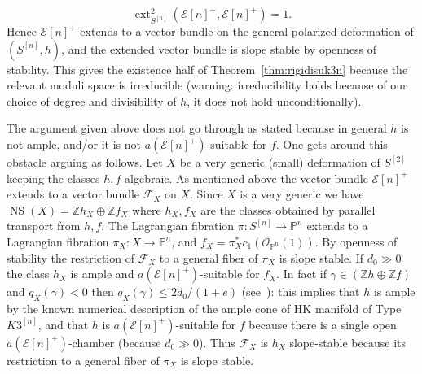 \documentclass[11pt]{amsart}
\newcommand{\PP}{{\mathbb P}}
\newcommand{\ZZ}{{\mathbb Z}}
\let\mathcal\mathscr
\def\cE{\mathcal{E}}
\def\cF{\mathcal{F}}
\def\cO{\mathcal{O}}
\DeclareMathOperator{\ext}{ext}
\DeclareMathOperator{\NS}{NS}
\theoremstyle{definition}
\theoremstyle{remark}
\begin{document}
%
\begin{equation}
%
\ext^2_{S^{[n]}}(\cE[n]^{+},\cE[n]^{+})=1. 
%
\end{equation}
%
Hence  $\cE[n]^{+}$ extends to a vector bundle on the general polarized deformation of 
$(S^{[n]},h)$, and the extended vector bundle is slope stable by openness of stability. This gives the existence half of Theorem~\ref{thm:rigidisuk3n}  because the relevant moduli space is irreducible 
(warning: irreducibility holds because of our choice of degree and divisibility of $h$, it does not hold unconditionally). 

The  argument given  above does not go through as stated because in 
general $h$ is not ample, and/or it is not $a(\cE[n]^{+})$-suitable for $f$. One gets around this obstacle arguing as follows. Let 
$X$ be a very generic (small) deformation of $S^{[2]}$ keeping the classes $h,f$ algebraic. As mentioned above the vector bundle $\cE[n]^{+}$ extends to a vector bundle $\cF_X$ on $X$. Since $X$ is a very generic we have $\NS(X)=\ZZ h_X\oplus\ZZ f_X$ where $h_X, f_X$ are the classes obtained by parallel transport from $h,f$. The Lagrangian fibration $\pi\colon S^{[n]}\to\PP^n$ extends to a Lagrangian fibration 
$\pi_X\colon X\to \PP^n$, and $f_X=\pi_X^{*}c_1(\cO_{\PP^n}(1))$. By openness of stability the 
restriction of $\cF_X$ to a general fiber of $\pi_X$ is slope stable.
If $d_0\gg 0$ the class $h_X$ is ample and $a(\cE[n]^{+})$-suitable for $f_X$. In fact if $\gamma\in(\ZZ h\oplus\ZZ f)$ and $q_X(\gamma)<0$ then 
$q_X(\gamma)\le 2d_0/(1+e)$ (see~\cite[Lmm.~4.3]{og:fascimod}): this implies that $h$ is ample by the known numerical description of the ample cone of HK manifold of Type $K3^{[n]}$, and  that $h$ is  $a(\cE[n]^{+})$-suitable for $f$ because there is a single 
open $a(\cE[n]^{+})$-chamber (because $d_0\gg 0$). Thus $\cF_X$ is $h_X$ slope-stable because its restriction  to a general fiber of $\pi_X$ is slope stable.
%
\end{document}
